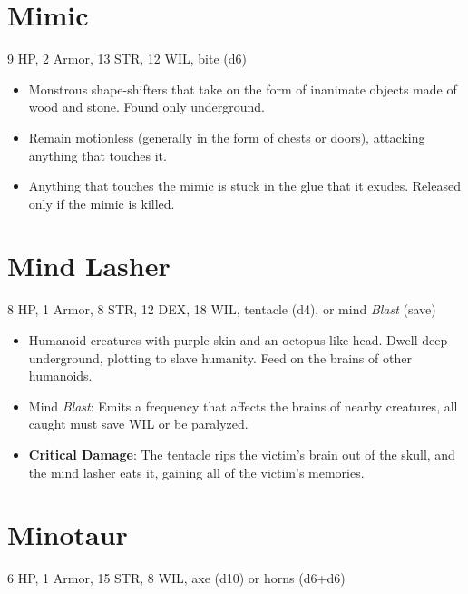 \documentclass[
  10pt,
  american,
]{article}
\begin{document}
\hypertarget{mimic}{%
\section{Mimic}\label{mimic}}

9 HP, 2 Armor, 13 STR, 12 WIL, bite (d6)

\begin{samepage}
\begin{itemize}
\setlength\itemsep{-.5em}
\item Monstrous shape-shifters that take on the form of inanimate objects made of wood and stone. Found only underground.
\item Remain motionless (generally in the form of chests or doors), attacking anything that touches it.
\item Anything that touches the mimic is stuck in the glue that it exudes. Released only if the mimic is killed.
\end{itemize}
\end{samepage}

\hypertarget{mind-lasher}{%
\section{Mind Lasher}\label{mind-lasher}}

8 HP, 1 Armor, 8 STR, 12 DEX, 18 WIL, tentacle (d4), or mind
\emph{Blast} (save)

\begin{samepage}
\begin{itemize}
\setlength\itemsep{-.5em}
\item Humanoid creatures with purple skin and an octopus-like head. Dwell deep underground, plotting to slave humanity. Feed on the brains of other humanoids.
\item Mind \emph{Blast}: Emits a frequency that affects the brains of nearby creatures, all caught must save WIL or be paralyzed.
\item \textbf{Critical Damage}: The tentacle rips the victim's brain out of the skull, and the mind lasher eats it, gaining all of the victim's memories.
\end{itemize}
\end{samepage}

\hypertarget{minotaur}{%
\section{Minotaur}\label{minotaur}}

6 HP, 1 Armor, 15 STR, 8 WIL, axe (d10) or horns (d6+d6)
\end{document}
